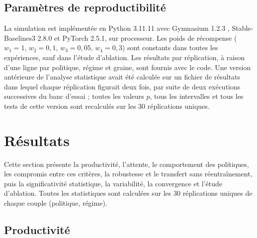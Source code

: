 \documentclass[11pt,a4paper]{article}
\newif\ifrevmarks
\newcommand{\revtag}[1]{\ifrevmarks\textsuperscript{\textcolor{red!70!black}{\scriptsize[#1]}}\fi}
\newcommand{\rev}[2]{\ifrevmarks{\color{revcolor}#2}\revtag{#1}\else#2\fi}
\newenvironment{revbloc}[1]{\par\ifrevmarks\color{revcolor}\noindent\revtag{#1}\ \fi}{\par}
\newcommand{\adir}[1]{\ifrevmarks\textcolor{violet}{\textbf{[À VALIDER AVEC LA DIRECTRICE : #1]}}\fi}
\begin{document}
\subsection{Paramètres de reproductibilité}

\begin{revbloc}{M3, A}
La simulation est implémentée en Python 3.11.11 avec Gymnasium 1.2.3 \cite{MarkTowers2025}, Stable-Baselines3 2.8.0 \cite{AntoninRaffin2021} et PyTorch 2.5.1, sur processeur. Les poids de récompense ($w_1 = 1$, $w_2 = 0{,}1$, $w_3 = 0{,}05$, $w_4 = 0{,}3$) sont constants dans toutes les expériences, sauf dans l'étude d'ablation. Les résultats par réplication, à raison d'une ligne par politique, régime et graine, sont fournis avec le code. Une version antérieure de l'analyse statistique avait été calculée sur un fichier de résultats dans lequel chaque réplication figurait deux fois, par suite de deux exécutions successives du banc d'essai ; toutes les valeurs $p$, tous les intervalles et tous les tests de cette version sont recalculés sur les 30 réplications uniques.
\end{revbloc}

\adir{la phrase sur la version antérieure de l'analyse est utile pour la directrice ; la retirer de la version soumise.}

\adir{vérifier que DQN (modèles enregistrés fin mai 2026) a été entraîné avec la même version de la récompense que PPO (début août 2026) ; sinon, réentraîner DQN (rapport d'audit, N11).}


\section{Résultats}
\label{sec:results}

Cette section présente la productivité, l'attente, le comportement des politiques, les compromis entre ces critères, la robustesse et le transfert sans réentraînement, puis la significativité statistique, la variabilité, la convergence et l'étude d'ablation. \rev{M3}{Toutes les statistiques sont calculées sur les 30 réplications uniques de chaque couple (politique, régime).}

\subsection{Productivité}
\label{sec:productivity}
\end{document}
